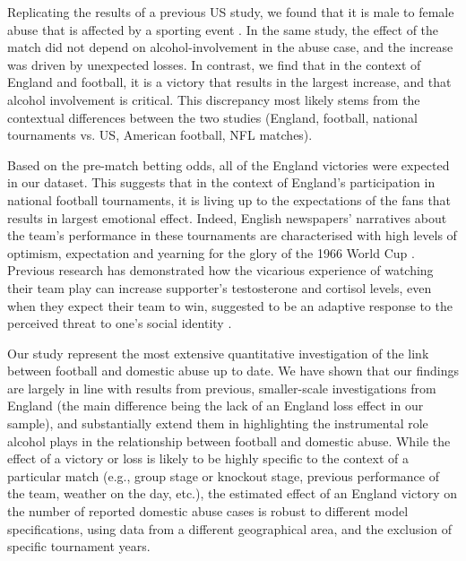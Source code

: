 \documentclass[12pt, a4paper]{article}
\begin{document}
 Replicating the results of a previous US study, we found that it is male to female abuse that is affected by a sporting event \cite{Card2011}. In the same study, the effect of the match did not depend on alcohol-involvement in the abuse case, and the increase was driven by unexpected losses. In contrast, we find that in the context of England and football, it is a victory that results in the largest increase, and that alcohol involvement is critical. This discrepancy most likely stems from the contextual differences between the two studies (England, football, national tournaments vs. US, American football, NFL matches). 


Based on the pre-match betting odds, all of the England victories were expected in our dataset. This suggests that in the context of England's participation in national football tournaments, it is living up to the expectations of the fans that results in largest emotional effect. Indeed, English newspapers' narratives about the team's performance in these tournaments are characterised with high levels of optimism, expectation and yearning for the glory of the 1966 World Cup \cite{Vincent2010}. Previous research has demonstrated how the vicarious experience of watching their team play can increase supporter's testosterone and cortisol levels, even when they expect their team to win, suggested to be an adaptive response to the perceived threat to one's social identity \cite{VanderMeij2012}. 

 Our study represent the most extensive quantitative investigation of the link between football and domestic abuse up to date. We have shown that our findings are largely in line with results from previous, smaller-scale investigations from England (the main difference being the lack of an England loss effect in our sample), and substantially extend them in highlighting the instrumental role alcohol plays in the relationship between football and domestic abuse. While the effect of a victory or loss is likely to be highly specific to the context of a particular match (e.g., group stage or knockout stage, previous performance of the team, weather on the day, etc.), the estimated effect of an England victory on the number of reported domestic abuse cases is robust to different model specifications, using data from a different geographical area, and the exclusion of specific tournament years. 
\end{document}
